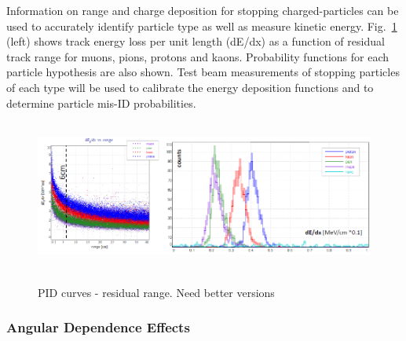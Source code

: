 \label{detbeam_pid}


Information on range and charge deposition for stopping charged-particles can be used to 
accurately identify particle type as well as measure kinetic energy. 
Fig.~\ref{fig:resrange}  (left) shows track energy loss per unit length (dE/dx) as a function of residual 
track range for muons, pions, protons and kaons. 
Probability functions for each particle hypothesis are also shown. 
Test beam measurements of stopping particles of each type will be used
to calibrate the energy deposition functions and to determine particle 
mis-ID probabilities. 
\begin{figure}[h!]
  \centering
\includegraphics[width=\textwidth,height=5.0cm]{figures/pid_curves}
\label{fig:resrange}
  \caption{PID curves - residual range.
{\color{red}
Need better versions
}
}
\end{figure}


\subsubsection{Angular Dependence Effects}


